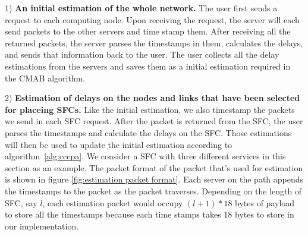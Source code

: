 1) \textbf{An initial estimation of the whole network.} The user first sends a request to each computing node. Upon receiving the request, the server will each send packets to the other servers and time stamp them. After receiving all the returned packets, the server parses the timestamps in them, calculates the delays, and sends that information back to the user. The user collects all the delay estimations from the servers and saves them as a initial estimation required in the CMAB algorithm.

2) \textbf{Estimation of delays on the nodes and links that have been selected for placeing SFCs.} Like the initial estimation, we also timestamp the packets we send in each SFC request. After the packet is returned from the SFC, the user parses the timestamps and calculate the delays on the SFC. Those estimations will then be used to update the initial estimation according to algorithm~\ref{alg:cccpa}.
We consider a SFC with three different services in this section as an example. The packet format of the packet that's used for estimation is shown in figure \ref{fig:estimation packet format}. Each server on the path appends the timestamps to the packet as the packet traverses. Depending on the length of SFC, say $l$, each estimation packet would occupy $(l+1)*18$ bytes of payload to store all the timestamps because each time stamps takes 18 bytes to store in our implementation.






